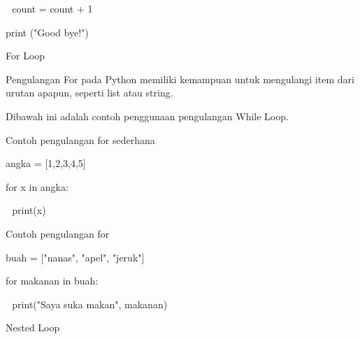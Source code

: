 \noindent 
\vspace{\baselineskip}
 $  $  $  $ count = count + 1 \par
\noindent 
\vspace{\baselineskip}
\vspace{\baselineskip}
print ("Good bye!") \par
\noindent 
\vspace{\baselineskip}
\vspace{\baselineskip}
\vspace{\baselineskip}
\vspace{12pt}
\noindent 
For Loop \par
\noindent 
Pengulangan For pada Python memiliki kemampuan untuk mengulangi item dari urutan apapun, seperti $  $list atau string. \par
\noindent 
 \vspace{\baselineskip}
\vspace{\baselineskip}
Dibawah ini adalah contoh penggunaan pengulangan While Loop. \par
\noindent 
\vspace{\baselineskip}
\vspace{12pt}
\noindent 
Contoh pengulangan for sederhana \par
\noindent 
\vspace{\baselineskip}
angka = [1,2,3,4,5] \par
\noindent 
\vspace{\baselineskip}
for x in angka: \par
\noindent 
\vspace{\baselineskip}
 $  $  $  $ print(x) \par
\noindent 
\vspace{\baselineskip}
\vspace{\baselineskip}
Contoh pengulangan for \par
\noindent 
\vspace{\baselineskip}
buah = ["nanas", "apel", "jeruk"] \par
\noindent 
\vspace{\baselineskip}
for makanan in buah: \par
\noindent 
\vspace{\baselineskip}
 $  $  $  $ print("Saya suka makan", makanan) \par
\noindent 
\vspace{\baselineskip}
\vspace{\baselineskip}
\vspace{12pt}
\noindent 
Nested Loop \par
